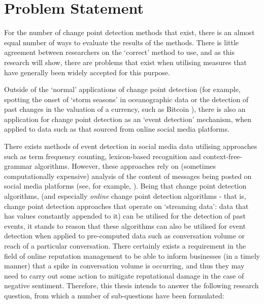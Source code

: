 \documentclass[../main.tex]{subfiles}
\begin{document}
\section{Problem Statement}
\label{Problem Statement}

For the number of change point detection methods that exist, there is an almost equal number of ways to evaluate the results of the methods. There is little agreement between researchers on the `correct' method to use, and as this research will show, there are problems that exist when utilising measures that have generally been widely accepted for this purpose.

Outside of the `normal' applications of change point detection (for example, spotting the onset of `storm seasons' in oceanographic data \cite{Killick2011} or the detection of past changes in the valuation of a currency, such as Bitcoin \cite{Buntain2014}), there is also an application for change point detection as an `event detection' mechanism, when applied to data such as that sourced from online social media platforms.

There exists methods of event detection in social media data utilising approaches such as term frequency counting, lexicon-based recognition and context-free-grammar algorithms. However, these approaches rely on (sometimes computationally expensive) analysis of the content of messages being posted on social media platforms (see, for example, \citeauthor{Alvanaki2011} \cite{Alvanaki2011}). Being that change point detection algorithms, (and especially \emph{online} change point detection algorithms - that is, change point detection approaches that operate on `streaming data': data that has values constantly appended to it) can be utilised for the detection of past events, it stands to reason that these algorithms can also be utilised for event detection when applied to pre-computed data such as conversation volume or reach of a particular conversation. There certainly exists a requirement in the field of online reputation management to be able to inform businesses (in a timely manner) that a spike in conversation volume is occurring, and thus they may need to carry out some action to mitigate reputational damage in the case of negative sentiment. Therefore, this thesis intends to answer the following research question, from which a number of sub-questions have been formulated:
\end{document}
